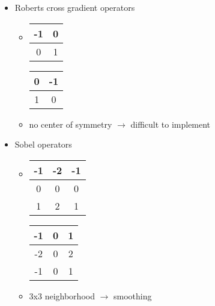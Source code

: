 \begin{itemize}
	\item Roberts cross gradient operators
		\begin{itemize}
		\item \begin{tabular}{|c|c|} \hline
		-1 & 0 \\ \hline
		 0 & 1 \\ \hline
		\end{tabular}
		\begin{tabular}{|c|c|} \hline
		 0 &-1 \\ \hline
		 1 & 0 \\ \hline
		\end{tabular}
	\item no center of symmetry $\rightarrow$ difficult to implement
	\end{itemize}
		\item  Sobel operators
		\begin{itemize}
		\item \begin{tabular}{|c|c|c|} \hline
		-1 &-2 &-1 \\ \hline
		 0 & 0 & 0 \\ \hline
		 1 & 2 & 1 \\ \hline
		\end{tabular}
		\begin{tabular}{|c|c|c|} \hline
		-1 & 0 & 1 \\ \hline
		-2 & 0 & 2 \\ \hline
		-1 & 0 & 1 \\ \hline
		\end{tabular}
		\item 3x3 neighborhood $\rightarrow$ smoothing
		\end{itemize}
\end{itemize}
